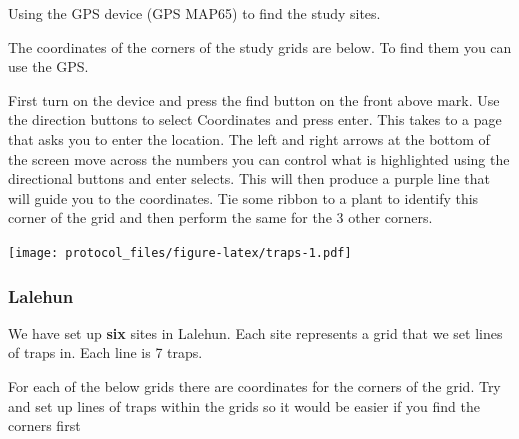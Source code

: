 \documentclass[
]{article}
\begin{document}
Using the GPS device (GPS MAP65) to find the study sites.

The coordinates of the corners of the study grids are below. To find
them you can use the GPS.

First turn on the device and press the find button on the front above
mark. Use the direction buttons to select Coordinates and press enter.
This takes to a page that asks you to enter the location. The left and
right arrows at the bottom of the screen move across the numbers you can
control what is highlighted using the directional buttons and enter
selects. This will then produce a purple line that will guide you to the
coordinates. Tie some ribbon to a plant to identify this corner of the
grid and then perform the same for the 3 other corners.

\texttt{[image: protocol\_files/figure-latex/traps-1.pdf]}

\hypertarget{lalehun}{%
\subsubsection{Lalehun}\label{lalehun}}

We have set up \textbf{six} sites in Lalehun. Each site represents a
grid that we set lines of traps in. Each line is 7 traps.

For each of the below grids there are coordinates for the corners of the
grid. Try and set up lines of traps within the grids so it would be
easier if you find the corners first
\end{document}
